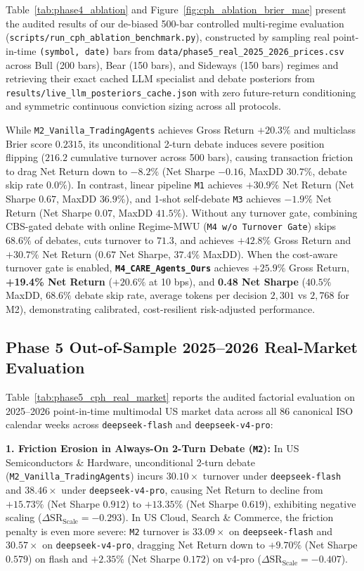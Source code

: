 \documentclass[10pt,a4paper,twocolumn]{article}
\begin{document}
Table~\ref{tab:phase4_ablation} and Figure~\ref{fig:cph_ablation_brier_mae} present the audited results of our de-biased 500-bar controlled multi-regime evaluation (\texttt{scripts/run\_cph\_ablation\_benchmark.py}), constructed by sampling real point-in-time \texttt{(symbol, date)} bars from \texttt{data/phase5\_real\_2025\_2026\_prices.csv} across Bull (200 bars), Bear (150 bars), and Sideways (150 bars) regimes and retrieving their exact cached LLM specialist and debate posteriors from \texttt{results/live\_llm\_posteriors\_cache.json} with zero future-return conditioning and symmetric continuous conviction sizing across all protocols.

While \texttt{M2\_Vanilla\_TradingAgents} achieves Gross Return $+20.3\%$ and multiclass Brier score $0.2315$, its unconditional 2-turn debate induces severe position flipping ($216.2$ cumulative turnover across 500 bars), causing transaction friction to drag Net Return down to $-8.2\%$ (Net Sharpe $-0.16$, MaxDD $30.7\%$, debate skip rate $0.0\%$). In contrast, linear pipeline \texttt{M1} achieves $+30.9\%$ Net Return (Net Sharpe $0.67$, MaxDD $36.9\%$), and 1-shot self-debate \texttt{M3} achieves $-1.9\%$ Net Return (Net Sharpe $0.07$, MaxDD $41.5\%$). Without any turnover gate, combining CBS-gated debate with online Regime-MWU (\texttt{M4 w/o Turnover Gate}) skips $68.6\%$ of debates, cuts turnover to $71.3$, and achieves $+42.8\%$ Gross Return and $+30.7\%$ Net Return ($0.67$ Net Sharpe, $37.4\%$ MaxDD). When the cost-aware turnover gate is enabled, \textbf{\texttt{M4\_CARE\_Agents\_Ours}} achieves $+25.9\%$ Gross Return, \textbf{+19.4\% Net Return} ($+20.6\%$ at 10 bps), and \textbf{0.48 Net Sharpe} ($40.5\%$ MaxDD, $68.6\%$ debate skip rate, average tokens per decision $2,301$ vs $2,768$ for M2), demonstrating calibrated, cost-resilient risk-adjusted performance.

\subsection{Phase 5 Out-of-Sample 2025--2026 Real-Market Evaluation}

Table~\ref{tab:phase5_cph_real_market} reports the audited factorial evaluation on 2025--2026 point-in-time multimodal US market data across all $86$ canonical ISO calendar weeks across \texttt{deepseek-flash} and \texttt{deepseek-v4-pro}:

\noindent\textbf{1. Friction Erosion in Always-On 2-Turn Debate (\texttt{M2}):} In US Semiconductors \& Hardware, unconditional 2-turn debate (\texttt{M2\_Vanilla\_TradingAgents}) incurs $30.10\times$ turnover under \texttt{deepseek-flash} and $38.46\times$ under \texttt{deepseek-v4-pro}, causing Net Return to decline from $+15.73\%$ (Net Sharpe $0.912$) to $+13.35\%$ (Net Sharpe $0.619$), exhibiting negative scaling ($\Delta\text{SR}_{\text{Scale}} = -0.293$). In US Cloud, Search \& Commerce, the friction penalty is even more severe: \texttt{M2} turnover is $33.09\times$ on \texttt{deepseek-flash} and $30.57\times$ on \texttt{deepseek-v4-pro}, dragging Net Return down to $+9.70\%$ (Net Sharpe $0.579$) on flash and $+2.35\%$ (Net Sharpe $0.172$) on v4-pro ($\Delta\text{SR}_{\text{Scale}} = -0.407$).
\end{document}
